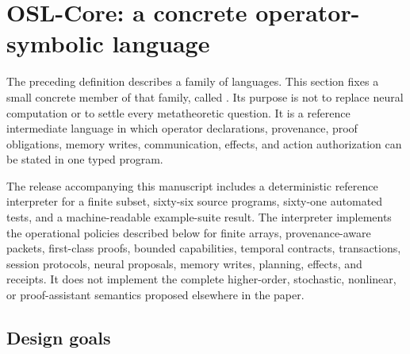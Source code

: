 \section{OSL-Core: a concrete operator-symbolic language}
\label{sec:osl-core}

The preceding definition describes a family of languages.  This section fixes a
small concrete member of that family, called \OSLCore.  Its purpose is not to
replace neural computation or to settle every metatheoretic question.  It is a
reference intermediate language in which operator declarations, provenance,
proof obligations, memory writes, communication, effects, and action
authorization can be stated in one typed program.

\begin{statusbox}
The release accompanying this manuscript includes a deterministic reference
interpreter for a finite subset, sixty-six source programs, sixty-one automated tests,
and a machine-readable example-suite result.  The interpreter implements the
operational policies described below for finite arrays, provenance-aware
packets, first-class proofs, bounded capabilities, temporal contracts,
transactions, session protocols, neural proposals, memory writes, planning,
effects, and receipts.  It does not implement
the complete higher-order, stochastic, nonlinear, or proof-assistant semantics
proposed elsewhere in the paper.
\end{statusbox}

\subsection{Design goals}

